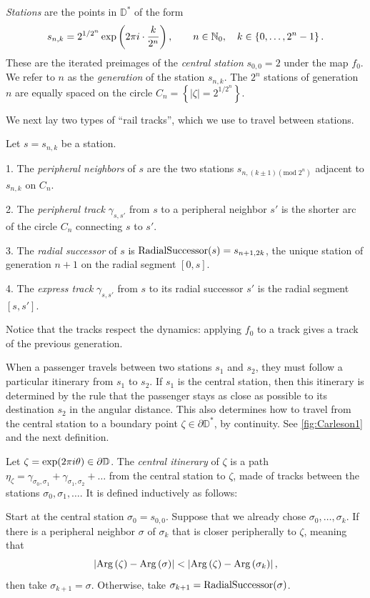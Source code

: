 \begin{definition}
\emph{Stations} are the points in $\mathbb D ^*$ of the form 
$$
s_{n,k}=2^{1/2^{n}} \exp\left(2\pi i \cdot \frac{k}{2^{n}}\right),\qquad n\in\mathbb{N}_{0},\quad k\in\left\{ 0,\ldots,2^{n}-1\right\}.
$$ 
These are the iterated preimages of the \emph{central station} $s_{0,0} = 2$ under the map $f_{0}$.
We refer to $n$ as the \emph{generation} of the station $s_{n,k}$. 
The $2^{n}$ stations of generation $n$ are equally spaced on the circle $C_{n}=\left\{ \left|\zeta\right|=2^{1/2^{n}}\right\} $. 
\end{definition}

We next lay two types of \enquote{rail tracks}, which we use to travel between stations.

\begin{definition}
Let $s=s_{n,k}$ be a station.

1. The \emph{peripheral neighbors} of $s$ are the two stations $s_{n,\left(k\pm1\right) (\mathrm{mod}\; 2^{n})}$ adjacent to $s_{n,k}$ on $C_{n}$.

2. The \emph{peripheral track }$\gamma_{s,s'}$ from $s$ to a peripheral neighbor $s'$
is the shorter arc of the circle $C_{n}$ connecting $s$ to $s'$.

3. The \emph{radial successor} of $s$ is $\operatorname{RadialSuccessor}(s)=s_{n+1,2k}$, the unique station of generation $n+1$ on the radial segment $[0,s]$.

4. The \emph{express track} $\gamma_{s,s'}$ from $s$ to its radial successor $s'$ is the radial segment $[s,s']$.
\end{definition}
Notice that the tracks respect the dynamics: applying $f_0$ to a track gives a track of the previous generation.

When a passenger travels between two stations $s_1$ and $s_2$, they must follow a particular itinerary from $s_1$ to $s_2$.
If $s_1$ is the central station, then this itinerary is determined by the rule that the passenger stays as close as possible to its destination $s_2$ in the angular distance.
This also determines how to travel from the central station to a boundary point $\zeta\in \partial \mathbb D^*$, by continuity. 
See \cref{fig:Carleson1} and the next definition.


\begin{definition}
Let $\zeta=\exp(2\pi i\theta)\in\partial\mathbb{D}$. 
The \emph{central itinerary} of $\zeta$ is a path 
$\eta_\zeta = \gamma _{\sigma_0,\sigma_1} + \gamma_{\sigma_1,\sigma_2}+\ldots$ 
from the central station to $\zeta$, made of tracks between the stations 
$\sigma_0,\sigma_1,\dots$. It is defined inductively as follows:

Start at the central station $\sigma_0=s_{0,0}$. Suppose that we already chose $\sigma_0,\ldots,\sigma_k$. If there is a peripheral neighbor $\sigma$ of $\sigma_k$ that is closer peripherally to $\zeta$, meaning that
$$
\left|\operatorname{Arg}\left(\zeta\right)-\operatorname{Arg}\left(\sigma\right)\right|
< \left|\operatorname{Arg}\left(\zeta\right)-\operatorname{Arg}\left(\sigma_{k}\right)\right|,
$$
then take $\sigma_{k+1}=\sigma$. Otherwise, take $\sigma_{k+1}=\operatorname{RadialSuccessor}(\sigma)$.
\end{definition}

